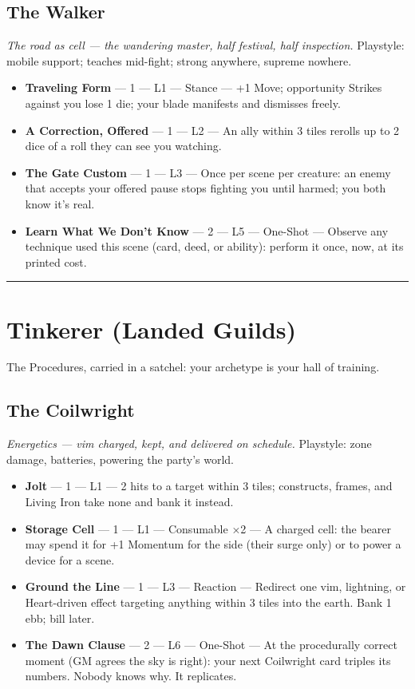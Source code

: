 \subsection{The Walker}
\textit{The road as cell --- the wandering master, half festival, half inspection.} Playstyle: mobile support; teaches mid-fight; strong anywhere, supreme nowhere.
\begin{itemize}
    \item \textbf{Traveling Form} --- 1 --- L1 --- Stance --- +1 Move; opportunity Strikes against you lose 1 die; your blade manifests and dismisses freely.
    \item \textbf{A Correction, Offered} --- 1 --- L2 --- An ally within 3 tiles rerolls up to 2 dice of a roll they can see you watching.
    \item \textbf{The Gate Custom} --- 1 --- L3 --- Once per scene per creature: an enemy that accepts your offered pause stops fighting you until harmed; you both know it's real.
    \item \textbf{Learn What We Don't Know} --- 2 --- L5 --- One-Shot --- Observe any technique used this scene (card, deed, or ability): perform it once, now, at its printed cost.
\end{itemize}

\medskip\hrule\medskip

\section{Tinkerer \textnormal{(Landed Guilds)}}

The Procedures, carried in a satchel: your archetype is your hall of training.

\subsection{The Coilwright}
\textit{Energetics --- vim charged, kept, and delivered on schedule.} Playstyle: zone damage, batteries, powering the party's world.
\begin{itemize}
    \item \textbf{Jolt} --- 1 --- L1 --- 2 hits to a target within 3 tiles; constructs, frames, and Living Iron take none and bank it instead.
    \item \textbf{Storage Cell} --- 1 --- L1 --- Consumable ×2 --- A charged cell: the bearer may spend it for +1 Momentum for the side (their surge only) or to power a device for a scene.
    \item \textbf{Ground the Line} --- 1 --- L3 --- Reaction --- Redirect one vim, lightning, or Heart-driven effect targeting anything within 3 tiles into the earth. Bank 1 ebb; bill later.
    \item \textbf{The Dawn Clause} --- 2 --- L6 --- One-Shot --- At the procedurally correct moment (GM agrees the sky is right): your next Coilwright card triples its numbers. Nobody knows why. It replicates.
\end{itemize}

